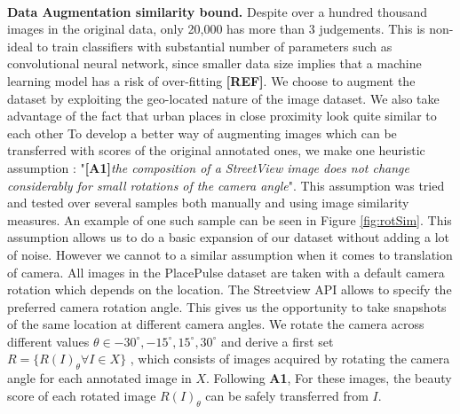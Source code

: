 \mbox{} \\
\noindent
\textbf{Data Augmentation similarity bound.}
Despite over a hundred thousand images in the original data, only 20,000 has more than 3 judgements.
This is non-ideal to train classifiers with substantial number of parameters such as convolutional neural network,
since smaller data size implies that a machine learning model has a risk of over-fitting \textbf{[REF]}. We choose to augment the dataset by exploiting the geo-located nature of the image dataset. We also take advantage of the fact that urban places in close proximity look quite similar to each other \cite{parislooklikeparis}  
To develop a better way of augmenting images which can be transferred with scores of the original annotated ones, we make one heuristic assumption : "\textbf{[A1]}\textit{the composition of a StreetView image does not change considerably for small rotations of the camera angle}". This assumption was tried and tested over several samples both manually and using image similarity measures. An example of one such sample can be seen in Figure \ref{fig:rotSim}. This assumption allows us to do a basic expansion of our dataset without adding a lot of noise. However we cannot to a similar assumption when it comes to translation of camera. 
All images in the PlacePulse dataset are taken with a default camera rotation which depends on the location. The Streetview API allows to specify the preferred camera rotation angle. This gives us the opportunity to take snapshots of the same location at different camera angles. We rotate the camera across different values $\theta \in {-30^{\circ}, -15^{\circ} , 15^{\circ} , 30^{\circ} }$ and derive a first set  $R=\{R(I)_{\theta} \forall I \in X\}$ , which consists of images acquired by rotating the camera angle for each annotated image in $X$. Following \textbf{A1}, For these images, the beauty score of each rotated image $R(I)_{\theta}$ can be safely transferred from $I$. 


